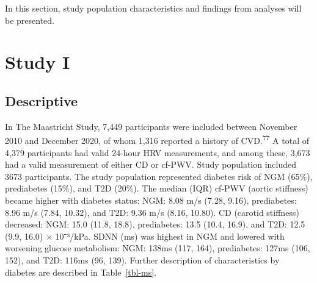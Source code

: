 \documentclass[
  a4paper,
  headsepline=true,
  open=left]{scrbook}
\begin{document}
\clearpage
\null
\thispagestyle{empty}
\clearpage

In this section, study population characteristics and findings from
analyses will be presented.

\hypertarget{study-i}{%
\section{Study I}\label{study-i}}

\hypertarget{descriptive}{%
\subsection{Descriptive}\label{descriptive}}

In The Maastricht Study, 7,449 participants were included between
November 2010 and December 2020, of whom 1,316 reported a history of
CVD.\textsuperscript{77} A total of 4,379 participants had valid 24-hour
HRV measurements, and among these, 3,673 had a valid measurement of
either CD or cf-PWV. Study population included 3673 participants. The
study population represented diabetes risk of NGM (65\%), prediabetes
(15\%), and T2D (20\%). The median (IQR) cf-PWV (aortic stiffness)
became higher with diabetes status: NGM: 8.08 m/s (7.28, 9.16),
prediabetes: 8.96 m/s (7.84, 10.32), and T2D: 9.36 m/s (8.16, 10.80). CD
(carotid stiffness) decreased: NGM: 15.0 (11.8, 18.8), prediabetes: 13.5
(10.4, 16.9), and T2D: 12.5 (9.9, 16.0) × 10⁻³/kPa. SDNN (ms) was
highest in NGM and lowered with worsening glucose metabolism: NGM: 138ms
(117, 164), prediabetes: 127ms (106, 152), and T2D: 116ms (96, 139).
Further description of characteristics by diabetes are described in
Table~\ref{tbl-ms}.

\end{document}

